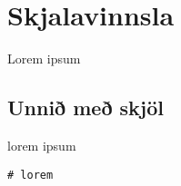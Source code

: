 
\chapter{Skjalavinnsla}\label{k:skjalavinnsla}
Lorem ipsum

\section{Unnið með skjöl}\label{uk:skjalavinnsla-kynnt}
lorem ipsum

\begin{lstlisting}[caption=??, label=lst:skjalavinnsla-kynnt]
# lorem
\end{lstlisting}

